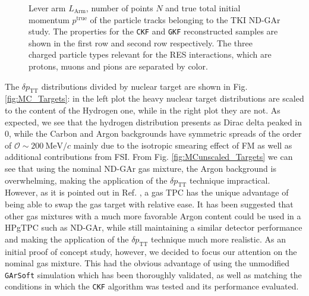 \begin{figure}[t]
\begin{subfigure}[b]{0.32\textwidth}
         \caption{}
         \label{fig:GAr_pparticles}
     \end{subfigure}
        \caption[Lever arm $L_\text{Arm}$, number of points $N$ and true total initial momentum $p^\text{true}$ of the particle tracks belonging to the TKI ND-GAr study.]{ Lever arm $L_\text{Arm}$, number of points $N$ and true total initial momentum $p^\text{true}$ of the particle tracks belonging to the TKI ND-GAr study. The properties for the \texttt{\texttt{CKF}} and \texttt{\texttt{GKF}} reconstructed samples are shown in the first row and second row respectively. The three charged particle types relevant for the RES interactions, which are protons, muons and pions are separated by color. } \label{fig:ALICEStRecoGAr_particles}
\end{figure}

The $\delta p_\text{TT}$ distributions divided by nuclear target are shown in Fig. \ref{fig:MC_Targets}: in the left plot the heavy nuclear target distributions are scaled to the content of the Hydrogen one, while in the right plot they are not. As expected, we see that the hydrogen distribution presents as Dirac delta peaked in 0, while the Carbon and Argon backgrounds have symmetric spreads of the order of $\mathcal{O}\sim 200 \ \text{MeV}/c$ mainly due to the isotropic smearing effect of FM as well as additional contributions from FSI. From Fig. \ref{fig:MCunscaled_Targets} we can see that using the nominal ND-GAr gas mixture, the Argon background is overwhelming, making the application of the $\delta p_\text{TT}$ technique impractical. However, as it is pointed out in Ref. \cite{Lu}, a gas TPC has the unique advantage of being able to swap the gas target with relative ease. It has been suggested that other gas mixtures with a much more favorable Argon content could be used in a HPgTPC such as ND-GAr, while still maintaining a similar detector performance and making the application of the $\delta p_\text{TT}$ technique much more realistic. As an initial proof of concept study, however, we decided to focus our attention on the nominal gas mixture. This had the obvious advantage of using the unmodified \texttt{GArSoft} simulation which has been thoroughly validated, as well as matching the conditions in which the \texttt{\texttt{CKF}} algorithm was tested and its performance evaluated.


